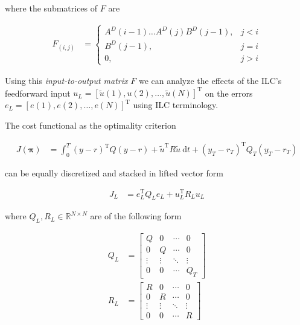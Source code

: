 \documentclass[10pt,a4paper]{article}
\newcommand{\state}{y} %
\newcommand{\error}{e} %
\newcommand{\traj}{r} %
\newcommand{\sysInput}{u} %
\newcommand{\linInput}{\tilde{u}} %
\newcommand{\policy}{\mathbf{\pi}}
\newcommand{\ValueFunction}{J}
\newcommand{\numSteps}{N} %
\begin{document}
\noindent where the submatrices of $F$ are

\begin{equation*}
\begin{aligned}
F_{(i,j)} &= \left \{
\begin{array}{cc}
A^{D}(i-1)\ldots A^{D}(j)B^{D}(j-1), & j < i \\ 
B^{D}(j-1), & j = i \\
0, & j > i 
\end{array} \right.
\end{aligned}
\end{equation*}

\noindent Using this \emph{input-to-output matrix} $F$ we can analyze the effects of the ILC's feedforward input $\sysInput_L = [\linInput(1), \sysInput(2), \ldots, \linInput(\numSteps)]^{\mathrm{T}}$ on the errors $\error_L = [\error(1), \error(2),\ldots,\error(\numSteps)]^{\mathrm{T}}$ using ILC terminology.

The cost functional as the optimality criterion

\begin{equation}
\begin{aligned}
\ValueFunction(\policy) &= \int_{0}^{T} (\state - \traj)^{\mathrm{T}}Q(\state - \traj) + \linInput^{\mathrm{T}}R\linInput \ \mathrm{d}t + (\state_T-\traj_T)^{\mathrm{T}}Q_{T}(\state_T-\traj_T)
\end{aligned}
\label{cost}
\end{equation}

\noindent can be equally discretized and stacked in lifted vector form

\begin{equation}
\begin{aligned}
\ValueFunction_L &= \error_L^{\mathrm{T}}Q_L\error_L + \sysInput_L^{\mathrm{T}}R_L\sysInput_L
\end{aligned}
\label{costFunctional}
\end{equation}

\noindent where $Q_L, R_L \in \mathbb{R}^{N \times N}$ are of the following form

\begin{equation*}
\begin{aligned}
 Q_L &= 
 \begin{bmatrix}
  Q & 0 & \cdots & 0 \\
  0 & Q & \cdots & 0 \\
  \vdots  & \vdots  & \ddots & \vdots  \\
  0 & 0 & \cdots & Q_T
 \end{bmatrix} \\
 R_L &= 
  \begin{bmatrix}
   R & 0 & \cdots & 0 \\
   0 & R & \cdots & 0 \\
   \vdots  & \vdots  & \ddots & \vdots  \\
   0 & 0 & \cdots & R
  \end{bmatrix}
\end{aligned}
\end{equation*}
\end{document}

